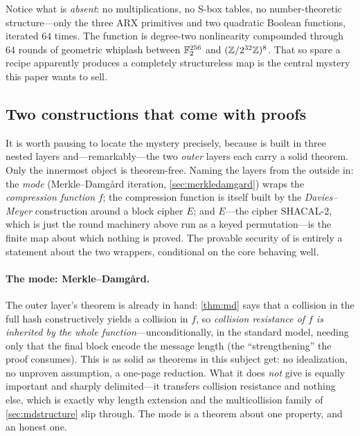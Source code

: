 Notice what is \emph{absent}: no multiplications, no S-box tables, no
number-theoretic structure---only the three ARX primitives and two
quadratic Boolean functions, iterated $64$ times. The function is
degree-two nonlinearity compounded through $64$ rounds of geometric
whiplash between $\mathbb{F}_2^{256}$ and $(\mathbb{Z}/2^{32}\mathbb{Z})^8$. That so spare a recipe
apparently produces a completely structureless map is the central mystery
this paper wants to sell.

\subsection{Two constructions that come with proofs}\label{sec:constructions}

It is worth pausing to locate the mystery precisely, because \SHA{} is
built in three nested layers and---remarkably---the two \emph{outer}
layers each carry a solid theorem. Only the innermost object is
theorem-free. Naming the layers from the outside in: the
\emph{mode} (Merkle--Damg{\aa}rd iteration, \cref{sec:merkledamgard})
wraps the \emph{compression function} $f$; the compression function is
itself built by the \emph{Davies--Meyer} construction around a block
cipher $E$; and $E$---the cipher SHACAL-2, which is just the round
machinery above run as a keyed permutation---is the finite map about
which nothing is proved. The provable security of \SHA{} is entirely a
statement about the two wrappers, conditional on the core behaving well.

\paragraph{The mode: Merkle--Damg{\aa}rd.} The outer layer's theorem is
already in hand: \cref{thm:md} says that a collision in the full hash
constructively yields a collision in $f$, so \emph{collision resistance
of $f$ is inherited by the whole function}---unconditionally, in the
standard model, needing only that the final block encode the message
length (the ``strengthening'' the proof consumes). This is as solid as
theorems in this subject get: no idealization, no unproven assumption, a
one-page reduction. What it does \emph{not} give is equally important and
sharply delimited---it transfers collision resistance and nothing else,
which is exactly why length extension and the multicollision family of
\cref{sec:mdstructure} slip through. The mode is a theorem about one
property, and an honest one.


